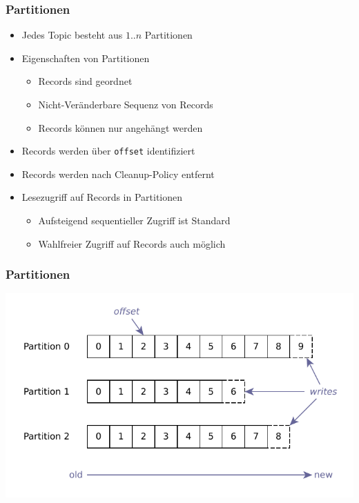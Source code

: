 \begin{frame}
\frametitle{Partitionen}
\begin{itemize}
	\item Jedes Topic besteht aus $1..n$ Partitionen
	\item Eigenschaften von Partitionen
	\begin{itemize}
		\item Records sind geordnet
		\item Nicht-Veränderbare Sequenz von Records
		\item Records können nur angehängt werden
	\end{itemize}
	\item Records werden über \texttt{offset} identifiziert
	\item Records werden nach Cleanup-Policy entfernt
	\item Lesezugriff auf Records in Partitionen
	\begin{itemize}
		\item Aufsteigend sequentieller Zugriff ist Standard
		\item Wahlfreier Zugriff auf Records auch möglich
	\end{itemize}
\end{itemize}
\end{frame}

\begin{frame}
\frametitle{Partitionen}
	\centering
	\includegraphics[scale=0.75]{figure/partitioned_log.pdf}
	
\end{frame}

